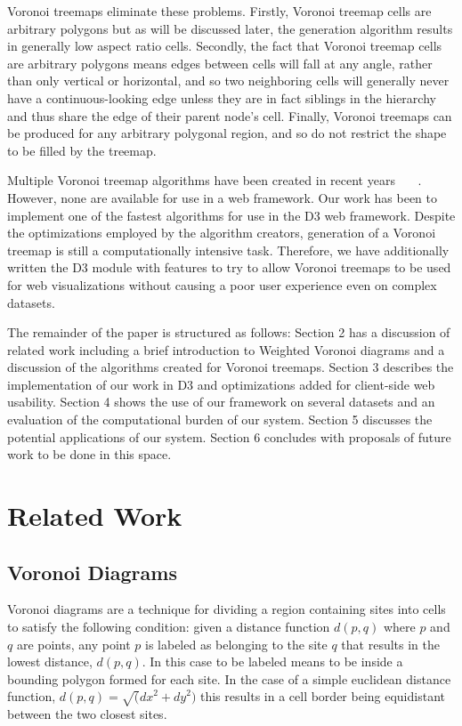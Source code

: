 \documentclass{acm_proc_article-sp}
\begin{document}
Voronoi treemaps eliminate these problems. Firstly, Voronoi treemap
cells are arbitrary polygons but as will be discussed later, the
generation algorithm results in generally low aspect ratio
cells. Secondly, the fact that Voronoi treemap cells are arbitrary
polygons means edges between cells will fall at any angle, rather than
only vertical or horizontal, and so two neighboring cells will
generally never have a continuous-looking edge unless they are in fact
siblings in the hierarchy and thus share the edge of their parent
node's cell. Finally, Voronoi treemaps can be produced for any
arbitrary polygonal region, and so do not restrict the shape to be
filled by the treemap.

Multiple Voronoi treemap algorithms have been created in recent years
~\cite{balzer:treemaps}~\cite{sud:fast}~\cite{nocaj:faster}. However,
none are available for use in a web framework.  Our work has been to
implement one of the fastest algorithms for use in the D3 web
framework. Despite the optimizations employed by the algorithm
creators, generation of a Voronoi treemap is still a computationally
intensive task. Therefore, we have additionally written the D3 module
with features to try to allow Voronoi treemaps to be used for web
visualizations without causing a poor user experience even on complex
datasets.

The remainder of the paper is structured as follows: Section 2 has a
discussion of related work including a brief introduction to Weighted
Voronoi diagrams and a discussion of the algorithms created for
Voronoi treemaps. Section 3 describes the implementation of our work
in D3 and optimizations added for client-side web usability. Section 4
shows the use of our framework on several datasets and an evaluation
of the computational burden of our system. Section 5 discusses the
potential applications of our system. Section 6 concludes with
proposals of future work to be done in this space.

\section{Related Work}

\subsection{Voronoi Diagrams}
Voronoi diagrams are a technique for dividing a region containing
sites into cells to satisfy the following condition: given a distance
function $d(p, q)$ where $p$ and $q$ are points, any point $p$ is
labeled as belonging to the site $q$ that results in the lowest
distance, $d(p,q)$. In this case to be labeled means to be inside a
bounding polygon formed for each site. In the case of a simple
euclidean distance function, $d(p,q) = \sqrt({dx}^2 + {dy}^2)$ this
results in a cell border being equidistant between the two closest
sites.
\end{document}
